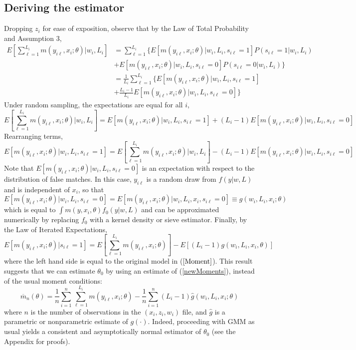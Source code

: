 \documentclass[12pt]{article}
\newcommand{\meanN}{\frac{1}{n}\sum_{i=1}^n}
\newcommand{\sumL}{\sum_{\ell=1}^{L_i}}
\newcommand{\meanL}{\frac{1}{L_i}\sumL}
\begin{document}
\subsection{Deriving the estimator}
Dropping $z_i$ for ease of exposition, observe that by the Law of Total Probability and Assumption 3, 
\begin{align*}
    E\left[\sumL m\left(y_{i\ell}, x_i; \theta\right) \Bigg\vert w_i, L_i \right] &=
    \sumL \Big\{ E[m(y_{i\ell}, x_i; \theta) | w_i, L_i, s_{i\ell}=1]P(s_{i\ell}=1| w_i, L_i) 
    \\&+ E[m(y_{i\ell}, x_i; \theta) | w_i, L_i, s_{i\ell}=0] P(s_{i\ell}=0| w_i, L_i) \Big\}\\
    &= \meanL \Bigg\{ E[m(y_{i\ell}, x_i; \theta) | w_i, L_i, s_{i\ell} = 1] \\&+ \frac{L_i-1}{L_i}E[m(y_{i\ell}, x_i; \theta) | w_i, L_i, s_{i\ell} = 0] \Bigg\}\end{align*}
Under random sampling, the expectations are equal for all $i$, 
\begin{equation*}
   E\left[\sumL m\left(y_{i\ell}, x_i; \theta\right) \Bigg\vert w_i, L_i \right] = E\left[m(y_{i\ell}, x_{i}; \theta) | w_i, L_i, s_{i\ell} = 1\right] + (L_i - 1)E\left[m(y_{i\ell}, x_i; \theta) | w_i, L_i, s_{i\ell} =0 \right] 
\end{equation*}
Rearranging terms, 
\begin{equation*} E[m(y_{i\ell}, x_i; \theta) | w_i, L_i, s_{i\ell}=1] = E\left[\sum_{\ell=1}^{L_i} m(y_{i\ell},x_i; \theta)\Bigg\vert w_i, L_i \right] - (L_i-1) E[m(y_{i\ell},x_i; \theta) | w_i, L_i, s_{i\ell} = 0] \end{equation*}
Note that $E[m(y_{i\ell}, x_i; \theta) | w_i, L_i, s_{i\ell} = 0]$ is an expectation with respect to the distribution of false matches.  In this case, $y_{i\ell}$ is a random draw from $f(y | w, L)$ and is independent of $x_i$, so that
$$ E[m(y_{i\ell}, x_i; \theta) | w_i, L_i, s_{i\ell} = 0] =  E[m(y_{i\ell}, x_i; \theta) | w_i, L_i, x_i, s_{i\ell} = 0] \equiv g(w_i, L_i, x_i; \theta)$$ 
which is equal to $\int m(y, x_i, \theta)f_0(y | w,L)$ and can be approximated numerically by replacing $f_0$ with a kernel density or sieve estimator. Finally, by the Law of Iterated Expectations,
\begin{equation}
E[m(y_{i\ell}, x_i; \theta) | s_{i\ell}=1] = E\left[\sum_{\ell=1}^{L_i} m(y_{i\ell},x_i; \theta)\right] -  E[(L_i -1)g(w_i,L_i,x_i, \theta)] \label{newMoments}
\end{equation}
where the left hand side is equal to the original model in ($\ref{Moment}$).  This result suggests that we can estimate $\theta_0$ by using an estimate of (\ref{newMoments}), instead of the usual moment conditions:
\begin{equation} \overline{m}_n(\theta) =  \meanN \sumL m(y_{i\ell}, x_i; \theta) -  \meanN(L_i - 1) \hat{g}(w_i, L_i, x_i; \theta) \label{estimates} \end{equation} 
where $n$ is the number of observations in the $(x_i, z_i, w_i)$ file, and $\hat{g}$ is a parametric or nonparametric estimate of $g(\cdot)$.  Indeed, proceeding with GMM as usual yields a consistent and asymptotically normal estimator of $\theta_0$ (see the Appendix for proofs).   
\end{document}
